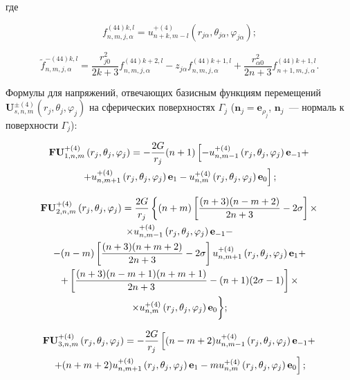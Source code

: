 \noindent где

\begin{equation}
f_{n,m,j,\alpha }^{(44)k,l} = u_{n + k,m - l}^{ + (4)}\left( {{r_{j\alpha }},{\theta _{j\alpha }},{\varphi _{j\alpha }}} \right);
\end{equation}

\begin{equation}
\tilde f_{n,m,j,\alpha }^{ - (44)k,l} = \frac{{r_{j0}^2}}{{2k + 3}}f_{n,m,j,\alpha }^{(44)k + 2,l} - {z_{j\alpha }}f_{n,m,j,\alpha }^{(44)k + 1,l} + \frac{{r_{\alpha 0}^2}}{{2n + 3}}f_{n + 1,m,j,\alpha }^{(44)k + 1,l}.
\end{equation}

Формулы для напряжений, отвечающих базисным функциям перемещений $\mathbf{U}_{s,n,m}^{\pm(4)}(r_j,\theta_j,\varphi_j)$ на сферических поверхностях $\Gamma_j$ ($\mathbf{n}_j=\mathbf{e}_{\rho_j}$, $\mathbf{n}_j$~--- нормаль к поверхности $\Gamma_j$):

\begin{multline}
{\bf{FU}}_{1,n,m}^{ + (4)}\left( {{r_j},{\theta _j},{\varphi _j}} \right) =  - \frac{{2G}}{{{r_j}}}(n + 1)\left[ { - u_{n,m - 1}^{ + (4)}\left( {{r_j},{\theta _j},{\varphi _j}} \right){{\bf{e}}_{ - 1}} + } \right.\\
\left. { + u_{n,m + 1}^{ + (4)}\left( {{r_j},{\theta _j},{\varphi _j}} \right){{\bf{e}}_1} - u_{n,m}^{ + (4)}\left( {{r_j},{\theta _j},{\varphi _j}} \right){{\bf{e}}_0}} \right];
\label{eq:8:f1}
\end{multline}

\begin{multline}
{\bf{FU}}_{2,n,m}^{ + (4)}\left( {{r_j},{\theta _j},{\varphi _j}} \right) = \frac{{2G}}{{{r_j}}}\left\{ {(n + m)\left[ {\frac{{(n + 3)(n - m + 2)}}{{2n + 3}} - 2\sigma } \right] \times } \right.\\
\times u_{n,m - 1}^{ + (4)}\left( {{r_j},{\theta _j},{\varphi _j}} \right){{\bf{e}}_{ - 1}} - \\
- (n - m)\left[ {\frac{{(n + 3)(n + m + 2)}}{{2n + 3}} - 2\sigma } \right]u_{n,m + 1}^{ + (4)}\left( {{r_j},{\theta _j},{\varphi _j}} \right){{\bf{e}}_1} + \\
+ \left[ {\frac{{(n + 3)(n - m + 1)(n + m + 1)}}{{2n + 3}} - (n + 1)(2\sigma  - 1)} \right] \times \\
\times u_{n,m}^{ + (4)}\left( {{r_j},{\theta _j},{\varphi _j}} \right){{\bf{e}}_0} \bigg\};
\label{eq:8:f2}
\end{multline}

\begin{multline}
{\bf{FU}}_{3,n,m}^{ + (4)}\left( {{r_j},{\theta _j},{\varphi _j}} \right) =  - \frac{{2G}}{{{r_j}}}\left[ {(n - m + 2)u_{n,m - 1}^{ + (4)}\left( {{r_j},{\theta _j},{\varphi _j}} \right){{\bf{e}}_{ - 1}} + } \right.\\
\left. { + (n + m + 2)u_{n,m + 1}^{ + (4)}\left( {{r_j},{\theta _j},{\varphi _j}} \right){{\bf{e}}_1} - mu_{n,m}^{ + (4)}\left( {{r_j},{\theta _j},{\varphi _j}} \right){{\bf{e}}_0}} \right];
\label{eq:8:f3}
\end{multline}


